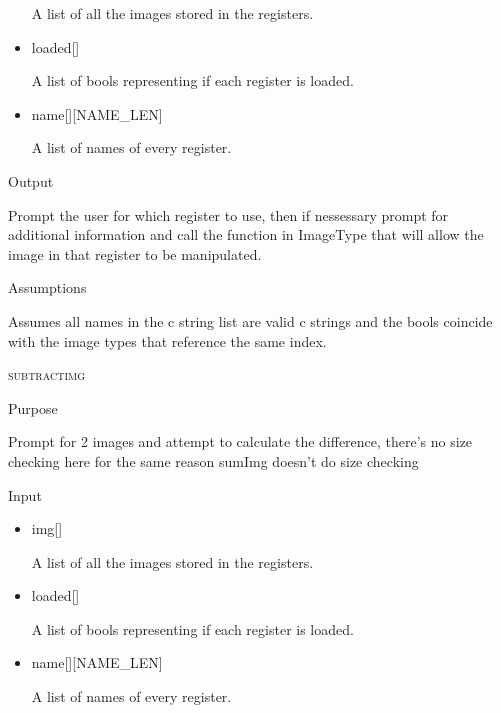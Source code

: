 \documentclass[pdftex, 11pt]{article}
\begin{document}
\begin{description}
\begin{description}
\begin{itemize}
						A list of all the images stored in the registers.

					\item{loaded[]}

						A list of bools representing if each register is loaded.

					\item{name[][NAME\_LEN]}

						A list of names of every register.

				\end{itemize}

			\item{Output}

				Prompt the user for which register to use, then if nessessary
				prompt for additional information and call the function
				in ImageType that will allow the image in that register to
				be manipulated.

			\item{Assumptions}

				Assumes all names in the c string list are valid c
				strings and the bools coincide with the image types that
				reference the same index.

		\end{description}



	\item{\textsc{subtractimg}}
		\begin{description}
			\item{Purpose}

				Prompt for 2 images and attempt to calculate the difference, there's no size
				checking here for the same reason sumImg doesn't do size checking

			\item{Input}

				\begin{itemize}

					\item{img[]}

						A list of all the images stored in the registers.

					\item{loaded[]}

						A list of bools representing if each register is loaded.

					\item{name[][NAME\_LEN]}

						A list of names of every register.

				\end{itemize}


\end{description}
\end{description}
\end{document}
